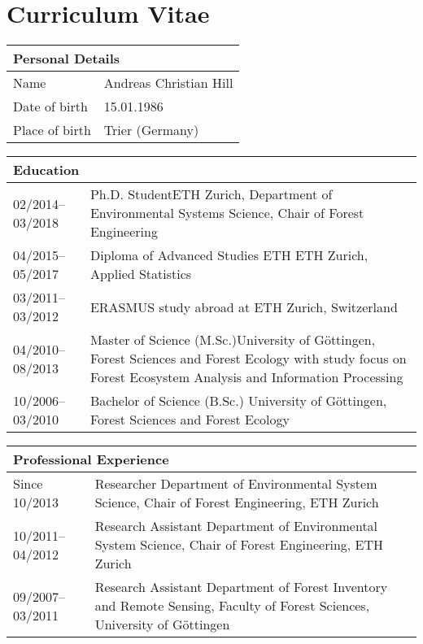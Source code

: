 \chapter*{Curriculum Vitae}
\label{chap:curriculum}
\renewcommand{\arraystretch}{1.5}
\pagestyle{plain}
\noindent
\begin{tabular*}{\textwidth}{p{}p{}}
\multicolumn{2}{l}{\large Personal Details}\\
\toprule
Name& Andreas Christian Hill\\
Date of birth& 15.01.1986\\
Place of birth&Trier (Germany)\\
\end{tabular*}

\noindent
\begin{tabular*}{\textwidth}{p{}p{}}
\multicolumn{2}{l}{\large Education}\\
\toprule
02/2014--03/2018& Ph.D. Student\newline ETH Zurich, Department of Environmental Systems Science, \newline Chair of Forest Engineering\\
04/2015--05/2017& Diploma of Advanced Studies ETH \newline ETH Zurich, Applied Statistics\\
03/2011--03/2012& ERASMUS study abroad at ETH Zurich, Switzerland \\
04/2010--08/2013&Master of Science (M.Sc.)\newline University of G{\"o}ttingen, Forest Sciences and Forest Ecology with study focus on Forest Ecosystem Analysis and Information Processing\\
10/2006--03/2010&Bachelor of Science (B.Sc.) \newline University of G{\"o}ttingen, Forest Sciences and Forest Ecology\\
\end{tabular*}


\noindent
\begin{tabular*}{\textwidth}{p{}p{}}
\multicolumn{2}{l}{\large Professional Experience}\\
\toprule
Since 10/2013&Researcher \newline Department of Environmental System Science, \newline Chair of Forest Engineering, ETH Zurich\\
10/2011--04/2012& Research Assistant \newline Department of Environmental System Science, \newline Chair of Forest Engineering, ETH Zurich \\
09/2007--03/2011& Research Assistant \newline Department of Forest Inventory and Remote Sensing, Faculty of Forest Sciences, University of G{\"o}ttingen
\end{tabular*}

